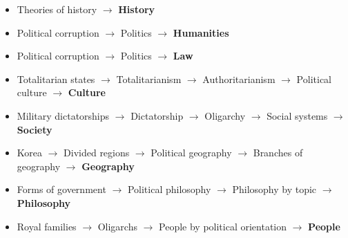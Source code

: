 \begin{itemize}

\item Theories of history $\rightarrow$ \textbf{History} 

\item Political corruption $\rightarrow$ Politics $\rightarrow$ \textbf{Humanities}

\item Political corruption $\rightarrow$ Politics $\rightarrow$ \textbf{Law} 


\item Totalitarian states $\rightarrow$ Totalitarianism $\rightarrow$ Authoritarianism $\rightarrow$ Political culture $\rightarrow$ \textbf{Culture}


\item Military dictatorships $\rightarrow$ Dictatorship $\rightarrow$ Oligarchy $\rightarrow$ Social systems $\rightarrow$ \textbf{Society} 


\item 
Korea $\rightarrow$ Divided regions $\rightarrow$ Political geography $\rightarrow$ Branches of geography $\rightarrow$ \textbf{Geography}


\item Forms of government $\rightarrow$ Political philosophy $\rightarrow$ Philosophy by topic $\rightarrow$ \textbf{Philosophy}

\item Royal families $\rightarrow$ Oligarchs $\rightarrow$ People by political orientation $\rightarrow$ \textbf{People} 


\end{itemize}


